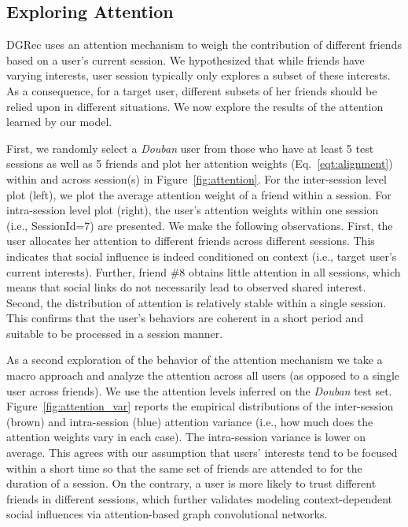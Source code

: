 \documentclass[sigconf]{acmart}
\begin{document}
\subsection{Exploring Attention}
\gls{DGRec} uses an attention mechanism to weigh the contribution of different friends based on a user's current session. We hypothesized that while friends have varying interests, user session typically only explores a subset of these interests. As a consequence, for a target user, different subsets of her friends should be relied upon in different situations.
We now explore the results of the attention learned by our model.

First, we randomly select a \textit{Douban} user from those who have at least 5 test sessions as well as 5 friends
and plot her attention weights (Eq.\ \ref{eqt:alignment}) within and across session(s) in Figure~\ref{fig:attention}. For the inter-session level plot (left), we plot the average attention weight of a friend within a session.
For intra-session level plot (right), the user's attention weights within one session (i.e., SessionId=7) are presented. We make the following observations. First, the user allocates her attention to different friends across different sessions. This indicates that social influence is indeed conditioned on context (i.e., target user's current interests). Further, friend \#8 obtains little attention in all sessions, which means that social links do not necessarily lead to observed shared interest. Second, the distribution of attention is relatively stable within a single session. This confirms that the user's behaviors are coherent in a short period and suitable to be processed in a session manner.

As a second exploration of the behavior of the attention mechanism we take a macro approach and analyze the attention across all users (as opposed to a single user across friends). 
We use the attention levels inferred on the \textit{Douban} test set. 
Figure~\ref{fig:attention_var} reports the empirical distributions of the inter-session (brown) and intra-session (blue) attention variance (i.e., how much does the attention weights vary in each case). The intra-session variance is lower on average. This agrees with our assumption that users' interests tend to be focused within a short time so that the same set of friends are attended to for the duration of a session. On the contrary, a user is more likely to trust different friends in different sessions, which further validates modeling context-dependent social influences via attention-based graph convolutional networks.
\end{document}
